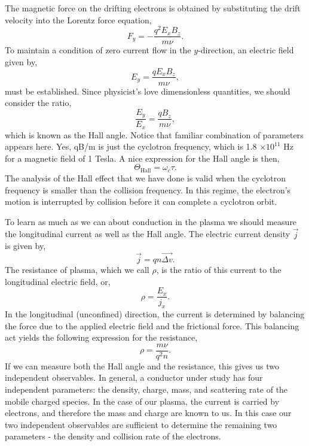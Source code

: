 \documentclass{../lab}
\begin{document}
The magnetic force on the drifting electrons is obtained by substituting the drift velocity into the Lorentz force equation,
\begin{equation}
    F_y = -\frac{q^2E_xB_z}{m \nu} .
\end{equation}
To maintain a condition of zero current flow in the $y$-direction, an electric field given by,
\begin{equation}
    E_y = \frac{qE_xB_z}{m \nu} ,
\end{equation}
must be established. Since physicist's love dimensionless quantities, we should consider the ratio,
\begin{equation}
    \frac{E_y}{E_x} = \frac{qB_z}{m \nu} ,
\end{equation}
which is known as the Hall angle. Notice that familiar combination of parameters appears here. Yes, qB/m is just the cyclotron frequency, which is 1.8 $\times 10^{11}$ Hz for a magnetic field of 1 Tesla. A nice expression for the Hall angle is then,
\begin{equation}
    \Theta_\textrm{Hall} = \omega_c \tau .
\end{equation}
The analysis of the Hall effect that we have done is valid when the cyclotron frequency is smaller than the collision frequency. In this regime, the electron's motion is interrupted by collision before it can complete a cyclotron orbit.

To learn as much as we can about conduction in the plasma we should measure the longitudinal current as well as the Hall angle. The electric current density $\vec{j}$ is given by,
\begin{equation}
    \vec{j} = q n \overrightarrow{\Delta v}.
\end{equation}
The resistance of plasma, which we call $\rho$, is the ratio of this current to the longitudinal electric field, or,
\begin{equation}
    \rho = \frac{E_x}{j_x}.
\end{equation}
In the longitudinal (unconfined) direction, the current is determined by balancing the force due to the applied electric field and the frictional force. This balancing act yields the following expression for the resistance,
\begin{equation}
    \rho = \frac{m\nu}{q^2n}.
\end{equation}
If we can measure both the Hall angle and the resistance, this gives us two independent observables. In general, a conductor under study has four independent parameters: the density, charge, mass, and scattering rate of the mobile charged species. In the case of our plasma, the current is carried by electrons, and therefore the mass and charge are known to us. In this case our two independent observables are sufficient to determine the remaining two parameters - the density and collision rate of the electrons.
\end{document}
